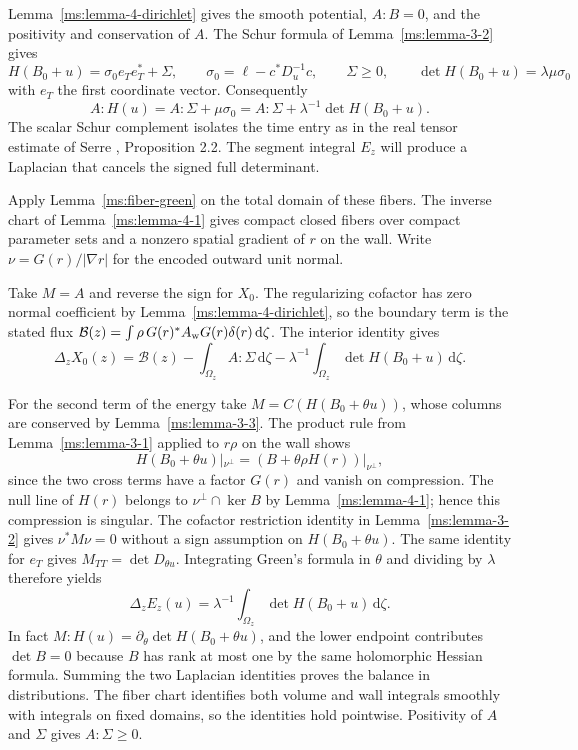 Lemma~\ref{ms:lemma-4-dirichlet} gives the smooth potential, $A:B=0$, and the positivity and conservation of $A$. The Schur formula of Lemma~\ref{ms:lemma-3-2} gives
\[
 H(B_0+u)=\sigma_0 e_Te_T^*+\Sigma,\qquad
 \sigma_0=\ell-c^*D_u^{-1}c,\qquad \Sigma\ge0,\qquad
 \det H(B_0+u)=\lambda\mu\sigma_0
\]
with $e_T$ the first coordinate vector. Consequently
\[
 A:H(u)=A:\Sigma+\mu\sigma_0=A:\Sigma+\lambda^{-1}\det H(B_0+u).
\]
The scalar Schur complement isolates the time entry as in the real tensor estimate of Serre \cite{r-71}, Proposition 2.2. The segment integral $E_z$ will produce a Laplacian that cancels the signed full determinant.

Apply Lemma~\ref{ms:fiber-green} on the total domain of these fibers. The inverse chart of Lemma~\ref{ms:lemma-4-1} gives compact closed fibers over compact parameter sets and a nonzero spatial gradient of $r$ on the wall. Write $\nu=G(r)/|\nabla r|$ for the encoded outward unit normal.

Take $M=A$ and reverse the sign for $X_0$. The regularizing cofactor has zero normal coefficient by Lemma~\ref{ms:lemma-4-dirichlet}, so the boundary term is the stated flux $\mathcal B(z)=\int\rho\,G(r)^*A_{\rm w}G(r)\delta(r)\,\mathrm d\zeta$. The interior identity gives
\[
 \Delta_z X_0(z)=\mathcal B(z)-\int_{\Omega_z} A:\Sigma\,\mathrm d\zeta
 -\lambda^{-1}\int_{\Omega_z}\det H(B_0+u)\,\mathrm d\zeta .
\]

For the second term of the energy take $M=C(H(B_0+\theta u))$, whose columns are conserved by Lemma~\ref{ms:lemma-3-3}. The product rule from Lemma~\ref{ms:lemma-3-1} applied to $r\rho$ on the wall shows
\[
 H(B_0+\theta u)|_{\nu^\perp}=(B+\theta\rho H(r))|_{\nu^\perp},
\]
since the two cross terms have a factor $G(r)$ and vanish on compression. The null line of $H(r)$ belongs to $\nu^\perp\cap\ker B$ by Lemma~\ref{ms:lemma-4-1}; hence this compression is singular. The cofactor restriction identity in Lemma~\ref{ms:lemma-3-2} gives $\nu^*M\nu=0$ without a sign assumption on $H(B_0+\theta u)$. The same identity for $e_T$ gives $M_{TT}=\det D_{\theta u}$. Integrating Green's formula in $\theta$ and dividing by $\lambda$ therefore yields
\[
 \Delta_z E_z(u)=\lambda^{-1}\int_{\Omega_z}\det H(B_0+u)\,\mathrm d\zeta .
\]
In fact $M:H(u)=\partial_\theta\det H(B_0+\theta u)$, and the lower endpoint contributes $\det B=0$ because $B$ has rank at most one by the same holomorphic Hessian formula. Summing the two Laplacian identities proves the balance in distributions. The fiber chart identifies both volume and wall integrals smoothly with integrals on fixed domains, so the identities hold pointwise. Positivity of $A$ and $\Sigma$ gives $A:\Sigma\ge0$.
